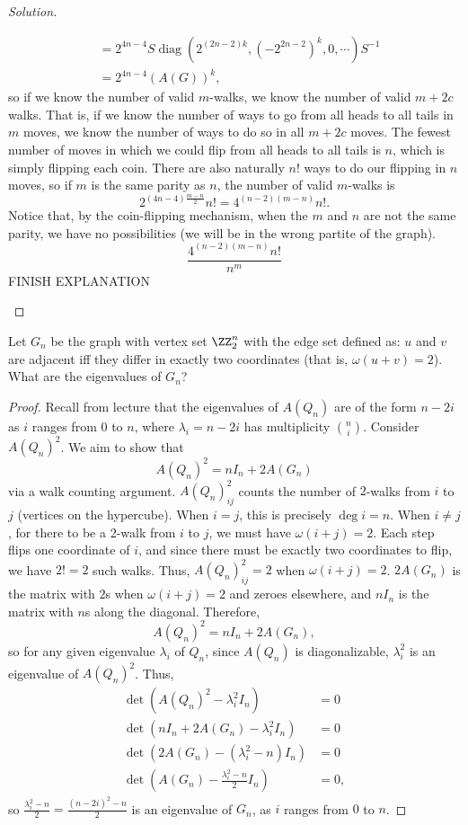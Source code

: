 \documentclass[11pt]{scrartcl}
\begin{document}
\begin{proof}[Solution]
\begin{enumerate}[(i)]
\begin{align*}
         &=2^{4n-4}S\mathop{\mathrm{diag}}(2^{(2n-2)k},(-2^{2n-2})^{k},0,\cdots)S^{-1}\\
         &=2^{4n-4}(A(G))^k,
     \end{align*}
     so if we know the number of valid $m$-walks, we know the number of valid $m+2c$ walks. That is, if we know the number of ways to go from all heads to all tails in $m$ moves, we know the number of ways to do so in all $m+2c$ moves. The fewest number of moves in which we could flip from all heads to all tails is $n$, which is simply flipping each coin. There are also naturally $n!$ ways to do our flipping in $n$ moves, so if $m$ is the same parity as $n$, the number of valid $m$-walks is \[2^{(4n-4)\frac{m-n}{2}}n!=4^{(n-2)(m-n)}n!.\] Notice that, by the coin-flipping mechanism, when the $m$ and $n$ are not the same parity, we have no possibilities (we will be in the wrong partite of the graph). \[\frac{4^{(n-2)(m-n)}n!}{n^m}\] FINISH EXPLANATION
 \end{enumerate}

\end{proof}
\begin{problem}
    Let $G_n$ be the graph with vertex set $\ZZ_2^n$ with the edge set defined as: $u$ and $v$ are adjacent iff they differ in exactly two coordinates (that is, $\omega(u+v)=2$). What are the eigenvalues of $G_n$?
    
\end{problem}
\begin{proof}
    Recall from lecture that the eigenvalues of $A(Q_n)$ are of the form $n-2i$ as $i$ ranges from $0$ to $n$, where $\lambda_i=n-2i$ has multiplicity $\binom{n}{i}$. Consider $A(Q_n)^2$. We aim to show that \[A(Q_n)^2=nI_n+2A(G_n)\] via a walk counting argument. $A(Q_n)^2_{ij}$ counts the number of $2$-walks from $i$ to $j$ (vertices on the hypercube). When $i=j$, this is precisely $\deg i=n$. When $i\neq j$, for there to be a $2$-walk from $i$ to $j$, we must have $\omega(i+j)=2$. Each step flips one coordinate of $i$, and since there must be exactly two coordinates to flip, we have $2!=2$ such walks. Thus, $A(Q_n)^2_{ij}=2$ when $\omega(i+j)=2$. $2A(G_n)$ is the matrix with $2$s when $\omega(i+j)=2$ and zeroes elsewhere, and $nI_n$ is the matrix with $n$s along the diagonal. Therefore, \[A(Q_n)^2=nI_n+2A(G_n),\] so for any given eigenvalue $\lambda_i$ of $Q_n$, since $A(Q_n)$ is diagonalizable, $\lambda_i^2$ is an eigenvalue of $A(Q_n)^2$. Thus,
    \begin{align*}
        \det(A(Q_n)^2-\lambda_i^2I_n)&=0\\
        \det(nI_n+2A(G_n)-\lambda_i^2I_n)&=0\\
        \det(2A(G_n)-(\lambda_i^2-n)I_n)&=0\\
        \det\left(A(G_n)-\frac{\lambda_i^2-n}{2}I_n\right)&=0,
    \end{align*} 
    so $\frac{\lambda_i^2-n}{2}=\frac{(n-2i)^2-n}{2}$ is an eigenvalue of $G_n$, as $i$ ranges from $0$ to $n$.
\end{proof}
\end{document}
